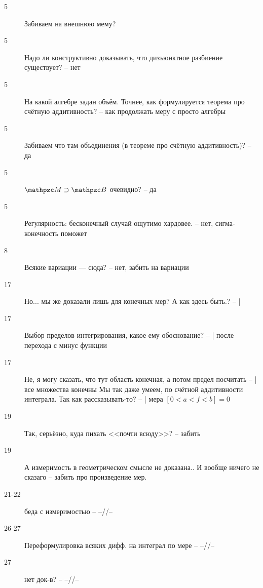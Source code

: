 \documentclass[timbord]{longnotes}
\begin{document}
\begin{description}
  \item[5] Забиваем на внешнюю мему?
  \item[5] Надо ли конструктивно доказывать, что дизъюнктное разбиение существует?                     -- нет
  \item[5] На какой алгебре задан объём. Точнее, как формулируется теорема про счётную аддитивность?   -- как продолжать меру с просто алгебры
  \item[5] Забиваем что там объединения (в теореме про счётную аддитивность)?                          -- да
  \item[5] $\lebesgue \supset \borel$ очевидно?                                                        -- да 
  \item[5] Регулярность: бесконечный случай ощутимо хардовее.                                          -- нет, сигма-конечность поможет
  \item[8] Всякие вариации --- сюда?                                                                   -- нет, забить на вариации
  \item[17] Но... мы же доказали лишь для конечных мер? А как здесь быть.?                             -- | 
  \item[17] Выбор пределов интегрирования, какое ему обоснование?                                      -- | после перехода с минус функции
  \item[17] Не, я могу сказать, что тут область конечная, а потом предел посчитать                     -- | все множества конечны
    Мы так даже умеем, по счётной аддитивности интеграла. Так как рассказывать-то?                     -- | мера $[0< a< f< b] = 0$
  \item[19] Так, серьёзно, куда пихать <<почти всюду>>?                                                -- забить
  \item[19] А измеримость в геометрическом смысле не доказана.. И вообще ничего не сказаго             -- забить
    про произведение мер.
  \item[21-22] беда с измеримостью                                                                     -- --//--
  \item[26-27] Переформулировка всяких дифф. на интеграл по мере                                       -- --//-- 
  \item[27] нет док-в?                                                                                 -- --//-- 

\end{description}
\end{document}
